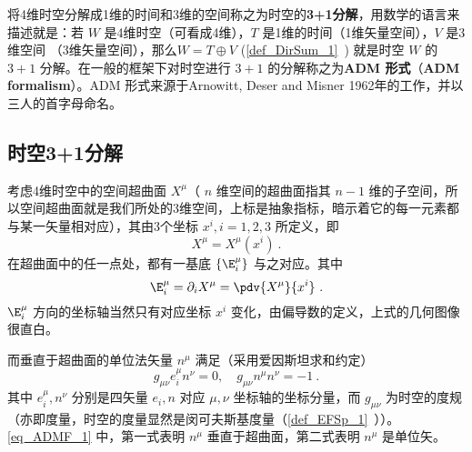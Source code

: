 

将4维时空分解成1维的时间和3维的空间称之为时空的\textbf{3+1分解}，用数学的语言来描述就是：若 $W$ 是4维时空（可看成4维），$T$ 是1维的时间（1维矢量空间），$V$ 是3维空间 （3维矢量空间），那么$W=T\oplus V$ (\autoref{def_DirSum_1}~) 就是时空 $W$ 的 $3+1$ 分解。在一般的框架下对时空进行 $3+1$ 的分解称之为\textbf{ADM 形式}（\textbf{ADM formalism}）。ADM 形式来源于Arnowitt, Deser and Misner 1962年的工作，并以三人的首字母命名。
\subsection{时空3+1分解}
考虑4维时空中的空间超曲面 $X^\mu$（ $n$ 维空间的超曲面指其 $n-1$ 维的子空间，所以空间超曲面就是我们所处的3维空间，上标是抽象指标，暗示着它的每一元素都与某一矢量相对应），其由3个坐标 $x^i,i=1,2,3$ 所定义，即 
\begin{equation}
X^\mu=X^\mu(x^i)~.
\end{equation}
在超曲面中的任一点处，都有一基底 $\{\E^\mu_i\}$ 与之对应。其中
\begin{equation}
\E^\mu_i=\partial_i  X^\mu=\pdv{ X^\mu}{x^i}~.
\end{equation}
$\E^\mu_i$ 方向的坐标轴当然只有对应坐标 $x^i$ 变化，由偏导数的定义，上式的几何图像很直白。

而垂直于超曲面的单位法矢量 $n^\mu$ 满足（采用爱因斯坦求和约定）
\begin{equation}\label{eq_ADMF_1}
g_{\mu\nu} e_i^\mu n^\nu=0,\quad g_{\mu\nu}n^\mu n^\nu=-1~.
\end{equation}
其中 $e_i^\mu,n^\nu$ 分别是四矢量 $ e_i,n$ 对应 $\mu,\nu$ 坐标轴的坐标分量，而 $g_{\mu\nu}$ 为时空的度规（亦即度量，时空的度量显然是闵可夫斯基度量（\autoref{def_EFSp_1}~））。\autoref{eq_ADMF_1} 中，第一式表明 $n^\mu$ 垂直于超曲面，第二式表明 $n^\mu$ 是单位矢。

